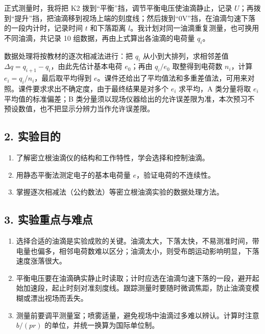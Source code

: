 正式测量时，我将把 K2 拨到“平衡”挡，调节平衡电压使油滴静止，记录 $U$；再拨到“提升”挡，把油滴移到视场上端的刻度线；然后拨到“0V”挡，在油滴匀速下落的一段内计时，记录时间 $t$ 和下落距离 $l$。我计划对同一油滴重复测量，也可换用不同油滴，共记录 10 组数据，再由上式算出各油滴的电荷量 $q_i$。

数据处理将按教材的逐次相减法进行：把 $q_i$ 从小到大排列，求相邻差值 $\Delta q=q_{i+1}-q_i$，由此先估计基本电荷 $e_0$；再由 $q_i/e_0$ 取整得到电荷数 $n_i$，计算 $e_i=q_i/n_i$，最后取平均得到 $e$。课件还给出了平均值法和多重差值法，可用来对照。课件要求求出不确定度，由于最终结果是对多个 $e_i$ 求平均，A 类分量将取 $e_i$ 平均值的标准偏差；B 类分量须以现场仪器给出的允许误差限为准，本次预习不预设数值，也不把显示分辨力当作允许误差限。

\subsection*{2. 实验目的}

\begin{enumerate}
\item 了解密立根油滴仪的结构和工作特性，学会选择和控制油滴。
\item 用静态平衡法测定电子的基本电荷量 $e$，验证电荷的不连续性。
\item 掌握逐次相减法（公约数法）等密立根油滴实验的数据处理方法。

\end{enumerate}
\subsection*{3. 实验重点与难点}

\begin{enumerate}
\item 选择合适的油滴是实验成败的关键。油滴太大，下落太快，不易测准时间，带电量也偏多，相邻电荷数难以区分；油滴太小，则受布朗运动影响明显，下落速度涨落很大。
\item 平衡电压要在油滴确实静止时读取；计时应选在油滴匀速下落的一段，避开起始加速段，起止时刻对准刻度线。跟踪测量时要随时微调焦距，防止油滴变模糊或漂出视场而丢失。
\item 测量前要调平测量室；喷雾适量，避免视场中油滴过多难以辨认。计算时注意 $b/(pr)$ 的单位，并统一换算为国际单位制。

\end{enumerate}
